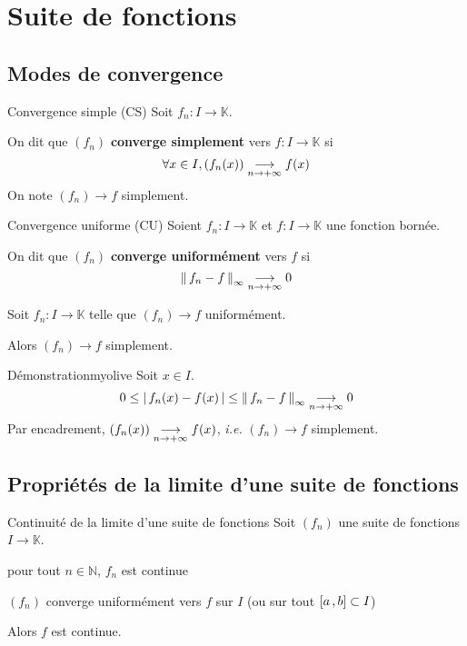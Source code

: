 \section{Suite de fonctions}

\subsection{Modes de convergence}

    \begin{defi}{Convergence simple (CS)}{}
        Soit $f_n : I \rightarrow \mathbb{K}$.

        On dit que $(f_n)$ \textbf{converge simplement} vers $f : I \rightarrow \mathbb{K}$ si 
        \[ \forall x \in I, \left( f_n(x) \right) \underset{n \rightarrow +\infty}{\longrightarrow} f(x) \] 
        On note $(f_n) \rightarrow f$ simplement.
    \end{defi}

    \begin{defi}{Convergence uniforme (CU)}{}
        Soient $f_n : I \rightarrow \mathbb{K}$ et $f : I \rightarrow \mathbb{K}$ une fonction bornée.
        
        On dit que $(f_n)$ \textbf{converge uniformément} vers $f$ si 
        \[ \left\lVert\,f_n - f\,\right\rVert_{\infty} \underset{n \rightarrow +\infty}{\longrightarrow} 0 \]
    \end{defi}

    \begin{prop}{}{}
        Soit $f_n : I \rightarrow \mathbb{K}$ telle que $(f_n) \rightarrow f$ uniformément.

        Alors $(f_n) \rightarrow f$ simplement.
    \end{prop}

    \begin{demo}{Démonstration}{myolive}
        Soit $x \in I$. 
        \[ 0 \leq \left\lvert \,f_n(x) - f(x) \, \right\rvert \leq \left\lVert\,f_n - f\,\right\rVert_{\infty} \underset{n \rightarrow +\infty}{\longrightarrow} 0 \] 
        Par encadrement, $(f_n(x)) \underset{n \rightarrow +\infty}{\longrightarrow} f(x)$, \textit{i.e.} $(f_n) \rightarrow f$ simplement.
    \end{demo}

\subsection{Propriétés de la limite d’une suite de fonctions}

    \begin{prop}{Continuité de la limite d’une suite de fonctions}{}
        Soit $(f_n)$ une suite de fonctions $I \rightarrow \mathbb{K}$. 
        \begin{suppose}
            \item pour tout $n \in \mathbb{N}$, $f_n$ est continue
            \item $(f_n)$ converge uniformément vers $f$ sur $I$ (ou sur tout $\left[ a \, , b \right] \subset I$)
        \end{suppose}
        Alors $f$ est continue.
    \end{prop}

